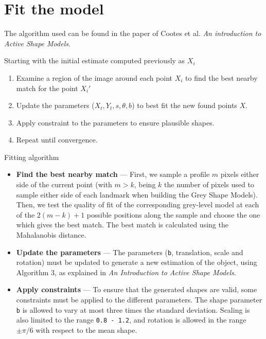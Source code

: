 \section{Fit the model}

The algorithm used can be found in the paper of Cootes et al.
\textit{An introduction to Active Shape Models}.

Starting with the initial estimate computed previously as $X_i$
\begin{algorithm}[h]
  \begin{enumerate}
  \item Examine a region of the image around each point $X_i$
    to find the best nearby match for the point ${X_i}'$
  \item Update the parameters ($X_t, Y_t, s, \theta, b$) to best
    fit the new found points $X$.
  \item Apply constraint to the parameters to ensure
    plausible shapes.
  \item Repeat until convergence.
 \end{enumerate}
\caption{Fitting algorithm}
\end{algorithm}

\begin{itemize}
\item \textbf{Find the best nearby match} --- First, we sample a
  profile $m$ pixels either side of the current point (with
  $m > k$, being $k$ the number of pixels used to sample either side
  of each landmark when building the Grey Shape Models). Then, we
  test the quality of fit of the corresponding grey-level model
  at each of the $2(m-k)+1$ possible positions along the sample
  and choose the one which gives the best match.
  The best match is calculated using the Mahalanobis distance.
\item \textbf{Update the parameters} --- The parameters (\texttt{b},
  translation, scale and rotation)
  must be updated to generate a new estimation of the object, using
  Algorithm 3, as explained in
  \textit{An Introduction to Active Shape Models}.
\item \textbf{Apply constraints} --- To ensure that the generated
  shapes are valid, some constraints must be applied to the different
  parameters. The shape parameter \texttt{b} is allowed to vary at most
  three times the standard deviation. Scaling is also limited to the range
  \texttt{0.8 - 1.2}, and rotation is allowed in the range $\pm\pi/6$
  with respect to the mean shape.
\end{itemize}

